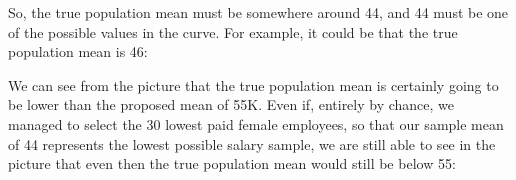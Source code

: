 \documentclass[../../../main.tex]{subfiles}
\begin{document}
So, the true population mean must be somewhere around 44, and 44 must be one of the possible values in the curve. For example, it could be that the true population mean is 46:

\begin{center}
\end{center}

\noindent
We can see from the picture that the true population mean is certainly going to be lower than the proposed mean of 55K. Even if, entirely by chance, we managed to select the 30 lowest paid female employees, so that our sample mean of 44 represents the lowest possible salary sample, we are still able to see in the picture that even then the true population mean would still be below 55:
\end{document}
